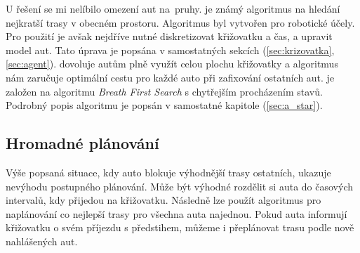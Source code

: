 U řešení \citet{Dresner} se mi nelíbilo omezení aut na~pruhy.
 je známý algoritmus na hledání nejkratší trasy v obecném prostoru.
Algoritmus byl vytvořen \citet*{Hart1968} pro robotické účely.
Pro použití  je avšak nejdříve nutné diskretizovat křižovatku a čas, a upravit model aut.
Tato úprava je popsána v samostatných sekcích (\ref{sec:krizovatka}, \ref{sec:agent}).
 dovoluje autům plně využít celou plochu křižovatky a algoritmus nám zaručuje optimální cestu pro každé auto při zafixování ostatních aut.
 je založen na algoritmu \emph{Breath First Search} s chytřejším procházením stavů.
Podrobný popis algoritmu je popsán v samostatné kapitole (\ref{sec:a_star}).

%

\subsection{Hromadné plánování}\label{subsec:hromadne_planovani}


Výše popsaná situace, kdy auto blokuje výhodnější trasy ostatních, ukazuje nevýhodu postupného plánování.
Může být výhodné rozdělit si auta do časových intervalů, kdy přijedou na křižovatku.
Následně lze použít algoritmus pro naplánování co nejlepší trasy pro všechna auta najednou.
Pokud auta informují křižovatku o svém příjezdu s předstihem, můžeme i přeplánovat trasu podle nově nahlášených aut.

%
%
%


